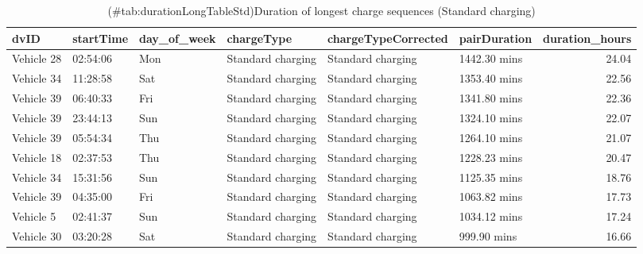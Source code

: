 \documentclass[]{article}
\begin{document}
\begin{table}[t]

\caption{(\#tab:durationLongTableStd)Duration of longest charge sequences (Standard charging)}
\centering
\begin{tabular}{l|l|l|l|l|l|r}
\hline
dvID & startTime & day\_of\_week & chargeType & chargeTypeCorrected & pairDuration & duration\_hours\\
\hline
Vehicle 28 & 02:54:06 & Mon & Standard charging & Standard charging & 1442.30 mins & 24.04\\
\hline
Vehicle 34 & 11:28:58 & Sat & Standard charging & Standard charging & 1353.40 mins & 22.56\\
\hline
Vehicle 39 & 06:40:33 & Fri & Standard charging & Standard charging & 1341.80 mins & 22.36\\
\hline
Vehicle 39 & 23:44:13 & Sun & Standard charging & Standard charging & 1324.10 mins & 22.07\\
\hline
Vehicle 39 & 05:54:34 & Thu & Standard charging & Standard charging & 1264.10 mins & 21.07\\
\hline
Vehicle 18 & 02:37:53 & Thu & Standard charging & Standard charging & 1228.23 mins & 20.47\\
\hline
Vehicle 34 & 15:31:56 & Sun & Standard charging & Standard charging & 1125.35 mins & 18.76\\
\hline
Vehicle 39 & 04:35:00 & Fri & Standard charging & Standard charging & 1063.82 mins & 17.73\\
\hline
Vehicle 5 & 02:41:37 & Sun & Standard charging & Standard charging & 1034.12 mins & 17.24\\
\hline
Vehicle 30 & 03:20:28 & Sat & Standard charging & Standard charging & 999.90 mins & 16.66\\
\hline
\end{tabular}
\end{table}
\end{document}
